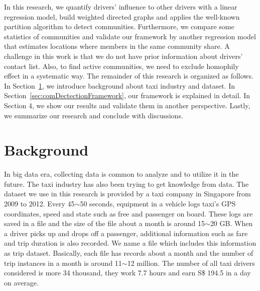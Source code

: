 \documentclass{article}
\begin{document}
In this research, we quantify drivers' influence to other drivers with a linear regression model, build weighted directed graphs and applies the well-known partition algorithm to detect communities. Furthermore, we compare some statistics of communities and validate our framework by another regression model that estimates locations where members in the same community share. A challenge in this work is that we do not have prior information about drivers' contact list. Also, to find active communities, we need to exclude homophily effect in a systematic way. The remainder of this research is organized as follows. In Section~\ref{sec:background}, we introduce background about taxi industry and dataset. In Section~\ref{sec:comDectectionFramework}, our framework is explained in detail. In Section 4, we show our results and validate them in another perspective. Lastly, we summarize our research and conclude with discussions.


\section{Background} \label{sec:background}

In big data era, collecting data is common to analyze and to utilize it in the future. The taxi industry has also been trying to get knowledge from data. The dataset we use in this research is provided by a taxi company in Singapore from 2009 to 2012. Every 45$\sim$50 seconds, equipment in a vehicle logs taxi's GPS coordinates, speed and state such as free and passenger on board. These logs are saved in a file and the size of the file about a month is around 15$\sim$20 GB. When a driver picks up and drops off a passenger, additional information such as fare and trip duration is also recorded. We name a file which includes this information as trip dataset. Basically, each file has records about a month and the number of trip instances in a month is around 11$\sim$12 million. The number of all taxi drivers considered is more 34 thousand, they work 7.7 hours and earn S\$ 194.5 in a day on average.
\end{document}
